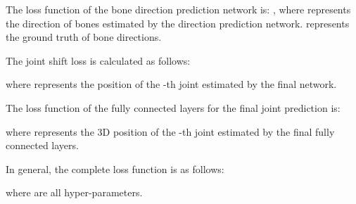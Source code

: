 \documentclass[journal]{IEEEtran}
\begin{document}
The loss function of the bone direction prediction network is:
,
where  represents the direction of bones estimated by the direction prediction network.  represents the ground truth of bone directions. \par
The joint shift loss \cite{2020Anatomy} is calculated as follows:


where  represents the position of the -th joint estimated by the final network. \par 
The loss function of the fully connected layers for the final joint prediction is:

where  represents the 3D position of the -th joint estimated by the final fully connected layers. 

In general, the complete loss function is as follows:

where  are all hyper-parameters. 
\end{document}
